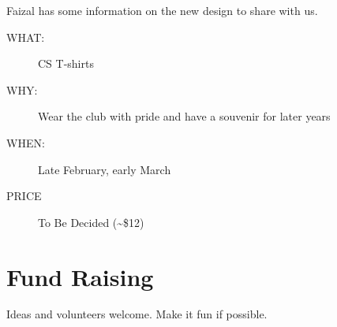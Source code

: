 Faizal has some information on the new design to share with us.

\begin{description}
\item[{WHAT:}] CS T-shirts
\item[{WHY:}] Wear the club with pride and have a souvenir for later years
\item[{WHEN:}] Late February, early March
\item[{PRICE}] To Be Decided (\textasciitilde{}\$12)
\end{description}


\newpage


\section{Fund Raising}
\label{sec-11}

Ideas and volunteers welcome. Make it fun if possible.


